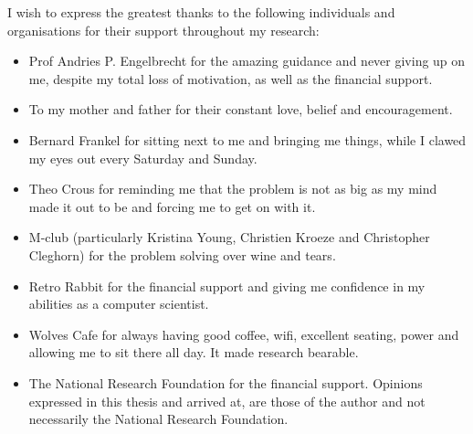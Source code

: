 \noindent I wish to express the greatest thanks to the following individuals and organisations for their support throughout my research:
\begin{itemize}
	\item Prof Andries P. Engelbrecht for the amazing guidance and never giving up on me, despite my total loss of motivation, as well as the financial support.
	\item To my mother and father for their constant love, belief and encouragement.
	\item Bernard Frankel for sitting next to me and bringing me things, while I clawed my eyes out every Saturday and Sunday.
	\item Theo Crous for reminding me that the problem is not as big as my mind made it out to be and forcing me to get on with it.
	\item M-club (particularly Kristina Young, Christien Kroeze and Christopher Cleghorn) for the problem solving over wine and tears.
	\item Retro Rabbit for the financial support and giving me confidence in my abilities as a computer scientist.
	\item Wolves Cafe for always having good coffee, wifi, excellent seating, power and allowing me to sit there all day. It made research bearable.
	\item The National Research Foundation for the financial support. Opinions expressed in this thesis and arrived at, are those of the author and not necessarily the National Research Foundation.
\end{itemize}


\cleardoublepage
\pagestyle{plain}
\setcounter{page}{1}
\ifpdf
{}
\fi
\tableofcontents


\cleardoublepage
\ifpdf
{}
\fi
{}
\listoffigures




\cleardoublepage
\ifpdf
{}
\fi
{}


\cleardoublepage
\ifpdf
{}
\fi
{}
\listoftables

